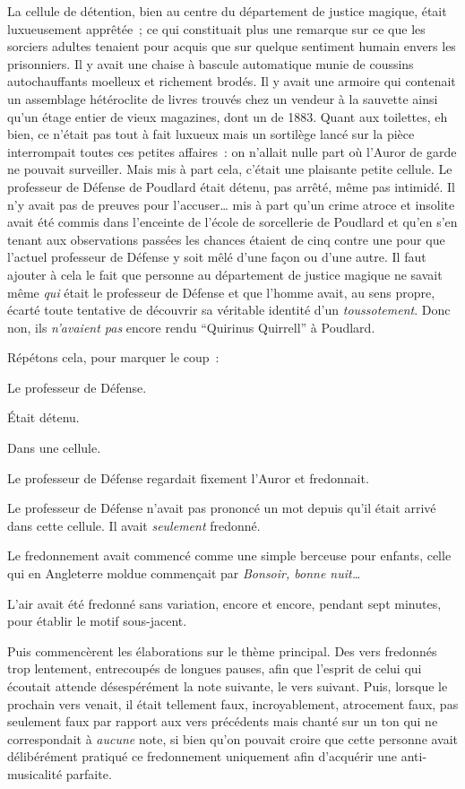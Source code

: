 \later

La cellule de détention, bien au centre du département de justice magique, était luxueusement apprêtée~; ce qui constituait plus une remarque sur ce que les sorciers adultes tenaient pour acquis que sur quelque sentiment humain envers les prisonniers. Il y avait une chaise à bascule automatique munie de coussins autochauffants moelleux et richement brodés. Il y avait une armoire qui contenait un assemblage hétéroclite de livres trouvés chez un vendeur à la sauvette ainsi qu'un étage entier de vieux magazines, dont un de 1883. Quant aux toilettes, eh bien, ce n'était pas tout à fait luxueux mais un sortilège lancé sur la pièce interrompait toutes ces petites affaires~: on n'allait nulle part où l'Auror de garde ne pouvait surveiller. Mais mis à part cela, c'était une plaisante petite cellule. Le professeur de Défense de Poudlard était détenu, pas arrêté, même pas intimidé. Il n'y avait pas de preuves pour l'accuser… mis à part qu'un crime atroce et insolite avait été commis dans l'enceinte de l'école de sorcellerie de Poudlard et qu'en s'en tenant aux observations passées les chances étaient de cinq contre une pour que l'actuel professeur de Défense y soit mêlé d'une façon ou d'une autre. Il faut ajouter à cela le fait que personne au département de justice magique ne savait même \emph{qui} était le professeur de Défense et que l'homme avait, au sens propre, écarté toute tentative de découvrir sa véritable identité d'un \emph{toussotement}. Donc non, ils \emph{n'avaient pas} encore rendu “Quirinus Quirrell” à Poudlard.

Répétons cela, pour marquer le coup~:

Le professeur de Défense.

Était détenu.

Dans une cellule.

Le professeur de Défense regardait fixement l'Auror et fredonnait.

Le professeur de Défense n'avait pas prononcé un mot depuis qu'il était arrivé dans cette cellule. Il avait \emph{seulement} fredonné.

Le fredonnement avait commencé comme une simple berceuse pour enfants, celle qui en Angleterre moldue commençait par \emph{Bonsoir, bonne nuit…}

L'air avait été fredonné sans variation, encore et encore, pendant sept minutes, pour établir le motif sous-jacent.

Puis commencèrent les élaborations sur le thème principal. Des vers fredonnés trop lentement, entrecoupés de longues pauses, afin que l'esprit de celui qui écoutait attende désespérément la note suivante, le vers suivant. Puis, lorsque le prochain vers venait, il était tellement faux, incroyablement, atrocement faux, pas seulement faux par rapport aux vers précédents mais chanté sur un ton qui ne correspondait à \emph{aucune} note, si bien qu'on pouvait croire que cette personne avait délibérément pratiqué ce fredonnement uniquement afin d'acquérir une anti-musicalité parfaite.

